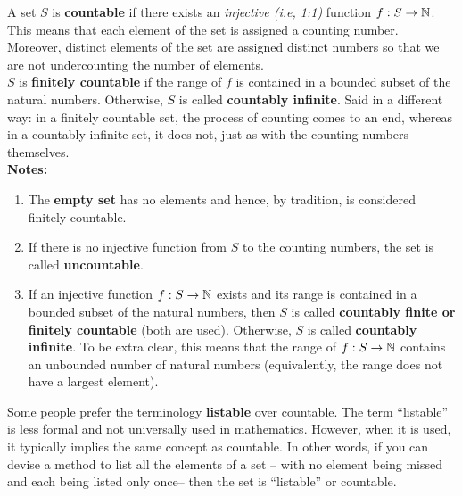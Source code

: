 \begin{tcolorbox}[colback=mylightblue,title = {What does it mean for a set to be countable?}, breakable]

\begin{definition} A set $S$ is \textbf{countable} if there exists an \textit{injective (i.e, 1:1)} function $f:S \to \mathbb N$. This means that each element of the set is assigned a counting number. Moreover, distinct elements of the set are assigned distinct numbers so that we are not undercounting the number of elements. \\

 $S$ is \textbf{finitely countable} if the range of $f$ is contained in a bounded subset of the natural numbers. Otherwise, $S$ is called \textbf{countably infinite}.  Said in a different way: in a finitely countable set, the process of counting comes to an end, whereas in a countably infinite set, it does not, just as with the counting numbers themselves.
 \\

\textbf{Notes:}
\begin{enumerate}
\renewcommand{\labelenumi}{(\alph{enumi})}
\setlength{\itemsep}{.2cm}

\item The \textbf{empty set} has no elements and hence, by tradition, is considered finitely countable. 

\item If there is no injective function from $S$ to the counting numbers, the set is called \textbf{uncountable}. 

\item If an injective function $f:S \to \mathbb N$ exists and its range is contained in a bounded subset of the natural numbers, then $S$ is called \textbf{countably finite or finitely countable} (both are used). Otherwise, $S$ is called \textbf{countably infinite}. To be extra clear, this means that the range of $f:S \to \mathbb N$ contains an unbounded number of natural numbers (equivalently, the range does not have a largest element).

\end{enumerate}
\end{definition}

\end{tcolorbox}

\bigskip

\begin{rem} Some people prefer the terminology \textbf{listable} over countable. The term ``listable'' is less formal and not universally used in mathematics. However, when it is used, it typically implies the same concept as countable. In other words, if you can devise a method to list all the elements of a set -- with no element being missed and each being listed only once-- then the set is ``listable'' or countable.
   
\end{rem}

